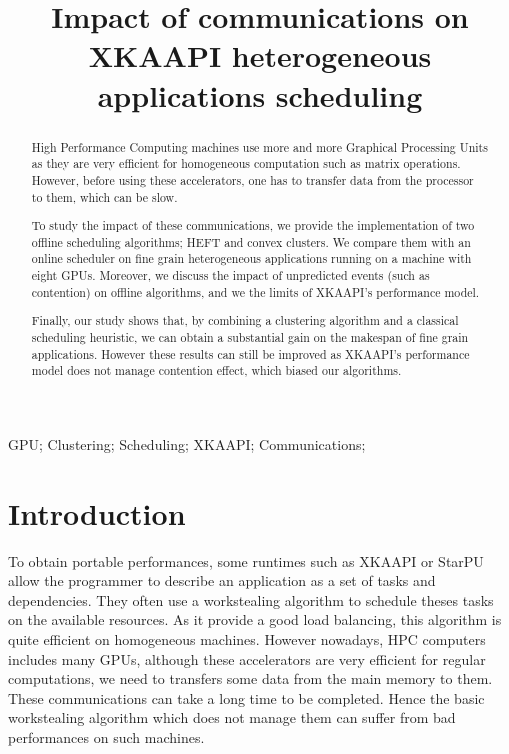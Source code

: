 \documentclass[10pt, conference, compsocconf,pdftex,dvipsnames]{IEEEtran}
\author{\IEEEauthorblockN{David Beniamine, Guillaume Huard}
    \IEEEauthorblockA{
        Université Joseph Fourier\\
        Laboratoire d'Informatique de Grenoble - Inria\\
        38330 Montbonnot St Martin, France\\
    david.beniamine@imag.fr, guillaume.huard@imag.fr}
}
\title{Impact of communications on XKAAPI heterogeneous applications
scheduling}
\begin{document}


\maketitle%
\begin{abstract}
    High Performance Computing machines use more and more Graphical Processing
    Units as they are very efficient for homogeneous computation such as
    matrix operations. However, before using these accelerators, one has to
    transfer data from the processor to them, which can be slow. 

    To study the impact of these communications, we  provide the
    implementation of two offline scheduling algorithms; HEFT and convex
    clusters.  We compare them with an online scheduler on fine grain
    heterogeneous applications running on a machine with eight GPUs. Moreover,
    we  discuss the impact of unpredicted events (such as contention) on
    offline algorithms, and we the limits of XKAAPI's performance model.

    Finally, our study shows that, by combining a clustering algorithm and a
    classical scheduling heuristic, we can obtain a substantial gain on the
    makespan of fine grain applications. However these results can still be
    improved as XKAAPI's performance model does not manage contention effect,
    which biased our algorithms.
\end{abstract}

\begin{IEEEkeywords}
    GPU; Clustering; Scheduling; XKAAPI; Communications;

\end{IEEEkeywords}




\section{Introduction}

To obtain portable performances, some runtimes such as XKAAPI
\cite{gautierxkaapi} or StarPU \cite{augonnet2011starpu} allow the programmer
to describe an application as a set of tasks and dependencies.  They often use
a workstealing algorithm \cite{blumofe1995cilk} to schedule theses tasks on
the available resources. As it provide a good load balancing, this algorithm
is quite efficient on homogeneous machines. However nowadays, HPC computers
includes many GPUs, although these accelerators are very efficient for regular
computations, we need to transfers some data from the main memory to them.
These communications can take a long time to be completed. Hence the basic
workstealing algorithm which does not manage them can suffer from bad 
performances on such machines.
\end{document}
